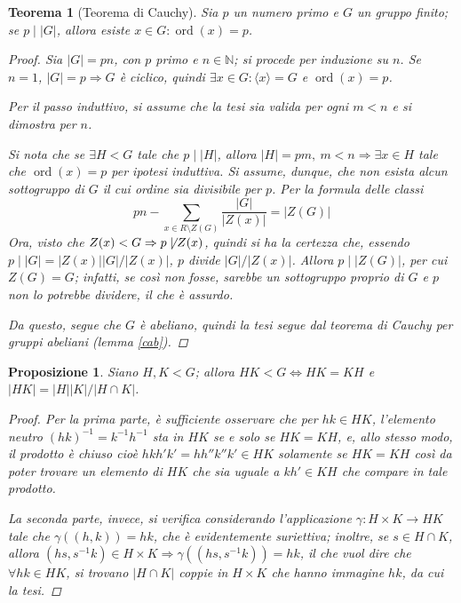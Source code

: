 \documentclass[11pt]{scrartcl}
\theoremstyle{style1}
\newtheorem{teorema}{Teorema}[section]
\newtheorem{prop}{Proposizione}[section]
\numberwithin{equation}{subsection}
\begin{document}
\begin{teorema}
	[Teorema di Cauchy]
	Sia $p$ un numero primo e $G$ un gruppo finito; se $p  \mid |G|$, allora esiste $x \in G : \operatorname{ord}(x) = p $.
	\begin{proof}
		Sia $|G| = pn$, con $p$ primo e $n \in \mathbb{N}$; si procede per induzione su $n$.
		Se $n=1$, $|G| = p \Rightarrow G$ \`e ciclico, quindi $\exists x \in G : \langle x \rangle=G$ e $\operatorname{ord}(x) = p$.

		Per il passo induttivo, si assume che la tesi sia valida per ogni $ m < n$ e si dimostra per $n$.

Si nota che se $\exists  H < G$ tale che $p  \mid  \lvert H \rvert $, allora $|H|=pm , \ m < n \Rightarrow \exists x \in H$ tale che $\operatorname{ord}(x) =p$ per ipotesi induttiva.
Si assume, dunque, che non esista alcun sottogruppo di $G$ il cui ordine sia divisibile per $p$.
Per la formula delle classi
\[
pn - \sum_{x \in R\setminus Z(G)}^{} \frac{\lvert G \rvert }{|Z(x)|} = \lvert Z(G) \rvert 
\] 
Ora, visto che $Z(x) < G \Rightarrow p \not  \mid Z(x)$, quindi si ha la certezza che, essendo $p  \mid |G| = |Z(x)| |G|/|Z(x)|$, $p$ divide $|G|/|Z(x)|$. 
Allora $p  \mid  |Z(G)|$, per cui $Z(G) =G$; infatti, se cos\`i non fosse, sarebbe un sottogruppo proprio di $G$ e $p$ non lo potrebbe dividere, il che \`e assurdo.

Da questo, segue che $G$ \`e abeliano, quindi la tesi segue dal teorema di Cauchy per gruppi abeliani (lemma \ref{cab}).
	\end{proof}
\end{teorema}
\begin{prop}\label{tgen}
Siano $H,K < G$; allora $HK < G \iff HK = KH$ e $\lvert HK \rvert = \lvert H \rvert \lvert K \rvert / \lvert H \cap K \rvert $.
\begin{proof}
Per la prima parte, \`e sufficiente osservare che per $hk \in HK$, l'elemento neutro $(hk)^{-1} = k^{-1} h^{-1} $ sta in $HK$ se e solo se $HK = KH$, e, allo stesso modo, il prodotto \`e chiuso cio\`e $hkh'k' = hh''k''k' \in HK$ solamente se $HK = KH$ cos\`i da poter trovare un elemento di $HK$ che sia uguale a $kh'\in KH$ che compare in tale prodotto.

La seconda parte, invece, si verifica considerando l'applicazione $\gamma: H \times K\to HK$ tale che $\gamma((h,k)) = hk$, che \`e evidentemente suriettiva; inoltre, se $s \in H \cap K$, allora $(hs,s^{-1}k) \in H \times K\Rightarrow \gamma ((hs,s^{-1}k)) = hk$, il che vuol dire che $\forall hk \in HK$, si trovano $|H\cap K|$ coppie in $H \times K$ che hanno immagine $hk$, da cui la tesi.
\end{proof}
\end{prop}
\end{document}
